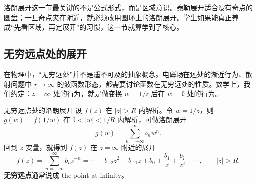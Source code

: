 \begin{tishi}[本节小结]
洛朗展开这一节最关键的不是公式形式，而是区域意识。泰勒展开适合没有奇点的圆盘；一旦奇点夹在附近，就必须改用圆环上的洛朗展开。学生如果能真正养成``先看区域，再定展开''的习惯，这一节就算学到了核心。
\end{tishi}

\subsection{无穷远点处的展开}

\begin{wulibj}[为什么要关心无穷远点]
在物理中，``无穷远处''并不是遥不可及的抽象概念。电磁场在远处的渐近行为、散射问题中 $r\to\infty$ 的波函数形态，都需要讨论函数在无穷远处的性质。数学上，我们约定：$z=\infty$ 处的行为，就是做变换 $w=1/z$ 后在 $w=0$ 处的行为。
\end{wulibj}

\begin{dingliyi}{无穷远点处的洛朗展开}{}
设 $f(z)$ 在 $|z|>R$ 内解析。令 $w=1/z$，则 $g(w)=f(1/w)$ 在 $0<|w|<1/R$ 内解析，可做洛朗展开
\[
    g(w) = \sum_{n=-\infty}^{\infty} b_n w^n.
\]
回到 $z$ 变量，就得到 $f(z)$ 在 $z=\infty$ 附近的展开
\[
    f(z) = \sum_{n=-\infty}^{\infty} b_n z^{-n}
    = \cdots + b_{-2}z^2 + b_{-1}z + b_0 + \frac{b_1}{z} + \frac{b_2}{z^2} + \cdots, \qquad |z|>R.
\]
\textbf{无穷远点}通常说成 the point at infinity。
\end{dingliyi}

